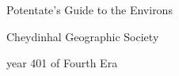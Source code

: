 
\begin{titlepage}
    \centering
    \vspace*{5cm}
    {\Huge\headerfont Potentate's Guide to the Environs \par}
    \vspace{1.5cm}
    {\Large\headerfont Cheydinhal Geographic Society \par}
    \vfill
    {\large\headerfont year 401 of Fourth Era \par}
    \thispagestyle{empty}
\end{titlepage}
\restoregeometry
\cleardoublepage

\makeatletter
\renewcommand{\contentsname}{} %
\setcounter{tocdepth}{1} 
\tableofcontents 
\makeatother
\restoregeometry
\cleardoublepage

